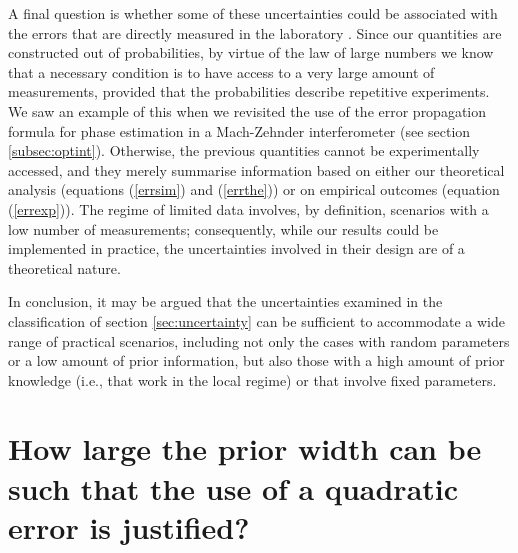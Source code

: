 A final question is whether some of these uncertainties could be associated with the errors that are directly measured in the laboratory \cite{li2018}. Since our quantities are constructed out of probabilities, by virtue of the law of large numbers we know that a necessary condition is to have access to a very large amount of measurements, provided that the probabilities describe repetitive experiments. We saw an example of this when we revisited the use of the error propagation formula for phase estimation in a Mach-Zehnder interferometer (see section \ref{subsec:optint}). Otherwise, the previous quantities cannot be experimentally accessed, and they merely summarise information based on either our theoretical analysis (equations (\ref{errsim}) and (\ref{errthe})) or on empirical outcomes (equation (\ref{errexp})). The regime of limited data involves, by definition, scenarios with a low number of measurements; consequently, while our results could be implemented in practice, the uncertainties involved in their design are of a theoretical nature.   

In conclusion, it may be argued that the uncertainties examined in the classification of section \ref{sec:uncertainty} can be sufficient to accommodate a wide range of practical scenarios, including not only the cases with random parameters or a low amount of prior information, but also those with a high amount of prior knowledge (i.e., that work in the local regime) or that involve fixed parameters.

\section{How large the prior width can be such that the use of a quadratic error is justified?}
\label{prior_sinapprox_appendix}

